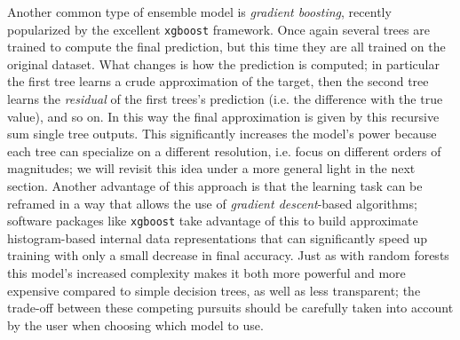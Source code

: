 Another common type of ensemble model is \emph{gradient boosting}, recently popularized by the excellent \texttt{xgboost} framework. Once again several trees are trained to compute the final prediction, but this time they are all trained on the original dataset. What changes is how the prediction is computed; in particular the first tree learns a crude approximation of the target, then the second tree learns the \emph{residual} of the first trees's prediction (i.e. the difference with the true value), and so on. In this way the final approximation is given by this recursive sum single tree outputs. This significantly increases the model's power because each tree can specialize on a different resolution, i.e. focus on different orders of magnitudes; we will revisit this idea under a more general light in the next section.
Another advantage of this approach is that the learning task can be reframed in a way that allows the use of \emph{gradient descent}-based algorithms; software packages like \texttt{xgboost} take advantage of this to build approximate histogram-based internal data representations that can significantly speed up training with only a small decrease in final accuracy.
Just as with random forests this model's increased complexity makes it both more powerful and more expensive compared to simple decision trees, as well as less transparent; the trade-off between these competing pursuits should be carefully taken into account by the user when choosing which model to use.













